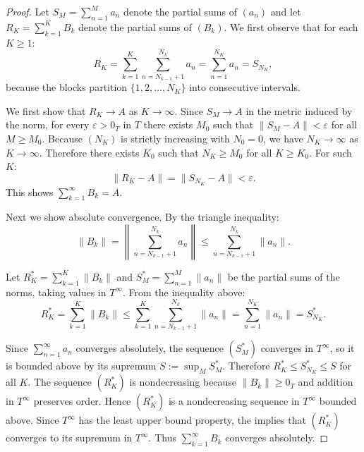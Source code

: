 \begin{proof}
    Let $S_M = \sum_{n=1}^M a_n$ denote the partial sums of $(a_n)$ and let $R_K = \sum_{k=1}^K B_k$ denote the partial sums of $(B_k)$. We first observe that for each $K \geq 1$:
    $$R_K = \sum_{k=1}^K \sum_{n=N_{k-1}+1}^{N_k} a_n = \sum_{n=1}^{N_K} a_n = S_{N_K},$$
    because the blocks partition $\{1, 2, \dots, N_K\}$ into consecutive intervals.

    We first show that $R_K \to A$ as $K \to \infty$. Since $S_M \to A$ in the metric induced by the norm, for every $\varepsilon > 0_T$ in $T$ there exists $M_0$ such that $\|S_M - A\| < \varepsilon$ for all $M \geq M_0$. Because $(N_K)$ is strictly increasing with $N_0 = 0$, we have $N_K \to \infty$ as $K \to \infty$. Therefore there exists $K_0$ such that $N_K \geq M_0$ for all $K \geq K_0$. For such $K$:
    $$\|R_K - A\| = \|S_{N_K} - A\| < \varepsilon.$$
    This shows $\sum_{k=1}^\infty B_k = A$.

    Next we show absolute convergence. By the triangle inequality:
    $$\|B_k\| = \left\|\sum_{n=N_{k-1}+1}^{N_k} a_n\right\| \leq \sum_{n=N_{k-1}+1}^{N_k} \|a_n\|.$$

    Let $R_K^* = \sum_{k=1}^K \|B_k\|$ and $S_M^* = \sum_{n=1}^M \|a_n\|$ be the partial sums of the norms, taking values in $T^\infty$. From the inequality above:
    $$R_K^* = \sum_{k=1}^K \|B_k\| \leq \sum_{k=1}^K \sum_{n=N_{k-1}+1}^{N_k} \|a_n\| = \sum_{n=1}^{N_K} \|a_n\| = S_{N_K}^*.$$

    Since $\sum_{n=1}^\infty a_n$ converges absolutely, the sequence $(S_M^*)$ converges in $T^\infty$, so it is bounded above by its supremum $S := \sup_M S_M^*$. Therefore $R_K^* \leq S_{N_K}^* \leq S$ for all $K$. The sequence $(R_K^*)$ is nondecreasing because $\|B_k\| \geq 0_T$ and addition in $T^\infty$ preserves order. Hence $(R_K^*)$ is a nondecreasing sequence in $T^\infty$ bounded above. Since $T^\infty$ has the least upper bound property, the  implies that $(R_K^*)$ converges to its supremum in $T^\infty$. Thus $\sum_{k=1}^\infty B_k$ converges absolutely.
\end{proof}
